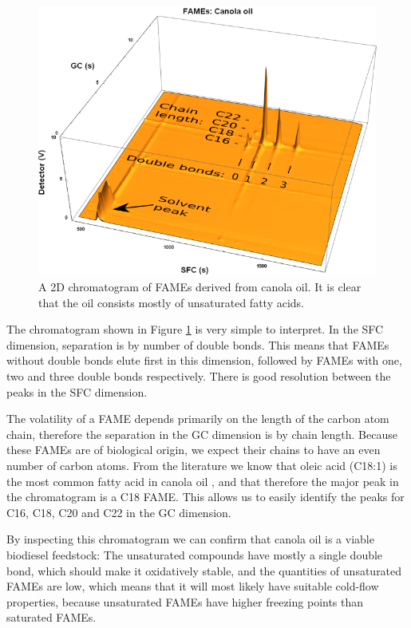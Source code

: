 \begin{figure}
\centering
\includegraphics[width=\textwidth]{Figures/Interpretation.png}
\decoRule

\caption[SFC×GC of canola oil]{A 2D chromatogram of FAMEs derived from
canola oil. It is clear that the oil consists mostly of unsaturated fatty
acids.}

\label{fig:2DCanola}
\end{figure}

The chromatogram shown in Figure \ref{fig:2DCanola} is very simple to interpret.
In the SFC dimension, separation is by number of double bonds.
This means that FAMEs without double bonds elute first in this dimension,
followed by FAMEs with one, two and three double bonds respectively. There is
good resolution between the peaks in the SFC dimension.

The volatility of a FAME depends primarily on the length of the carbon atom
chain, therefore the separation in the GC dimension is by chain length. Because
these FAMEs are of biological origin, we expect their chains to have an even
number of carbon atoms. From the literature we know that oleic acid (C18:1) is
the most common fatty acid in canola oil \autocite{JFAOWHOCAC2019}, and that
therefore the major peak in the chromatogram is a C18 FAME. This allows us to
easily identify the peaks for C16, C18, C20 and C22 in the GC dimension.

By inspecting this chromatogram we can confirm that canola oil is a viable
biodiesel feedstock: The unsaturated compounds have mostly a single double bond,
which should make it oxidatively stable, and the quantities of unsaturated FAMEs
are low, which means that it will most likely have suitable cold-flow
properties, because unsaturated FAMEs have higher freezing points than saturated
FAMEs.

